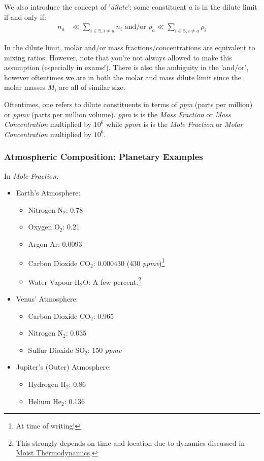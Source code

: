 We also introduce the concept of '\textit{dilute}': some constituent $a$ is in the dilute limit if and only if:
\begin{align*}
    n_a&\ll\sum\limits_{i\in\mathbb{S},i\neq a} n_i\text{   and/or   }
    \rho_a\ll\sum\limits_{i\in\mathbb{S},i\neq a} \rho_i
\end{align*}

In the dilute limit, molar and/or mass fractions/concentrations are equivalent to mixing ratios. However, note that you're not always allowed to make this assumption (especially in exams!). There is also the ambiguity in the 'and/or', however oftentimes we are in both the molar and mass dilute limit since the molar masses $M_i$ are all of similar size.

Oftentimes, one refers to dilute constituents in terms of \textit{ppm} (parts per million) or \textit{ppmv} (parts per million volume). \textit{ppm} is is the \textit{Mass Fraction} or \textit{Mass Concentration} multiplied by $10^{6}$ while \textit{ppmv} is is the \textit{Mole Fraction} or \textit{Molar Concentration} multiplied by $10^{6}$. 

\subsubsection{Atmospheric Composition: Planetary Examples}

In \textit{Mole-Fraction:}
\begin{multicols}{2}
\begin{itemize}
    \item Earth's Atmosphere: 
    \begin{itemize}
        \item Nitrogen N$_2$: 0.78
        \item Oxygen O$_2$: 0.21
        \item Argon Ar: 0.0093
        \item Carbon Dioxide CO$_2$: 0.000430 (430 \textit{ppmv})\footnote{At time of writing!}
        \item Water Vapour H$_2$O: A few percent.\footnote{This strongly depends on time and location due to dynamics discussed in \hyperref[Moist Thermodynamics]{Moist Thermodynamics}.}
    \end{itemize}
    \item  Venus' Atmosphere:
    \begin{itemize}
        \item Carbon Dioxide CO$_2$: 0.965
        \item Nitrogen N$_2$: 0.035
        \item Sulfur Dioxide SO$_2$: 150 \textit{ppmv}
    \end{itemize}
    \item  Jupiter's (Outer) Atmosphere:
    \begin{itemize}
        \item Hydrogen H$_2$: 0.86
        \item Helium He$_2$: 0.136
    \end{itemize}
\end{itemize}
\end{multicols}

